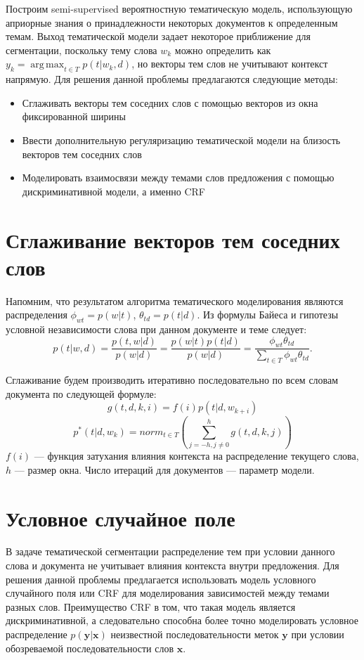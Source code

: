 \documentclass[pdftex,ptm,12pt,a4paper]{report}
\theoremstyle{definition}
\DeclareMathOperator*{\argmax}{arg\,max}
\begin{document}
 Построим semi-supervised вероятностную тематическую модель, использующую априорные знания о принадлежности некоторых документов к определенным темам. Выход тематической модели задает некоторое приближение для сегментации, поскольку тему слова $w_k$ можно определить как $y_k = \argmax_{t\in T}p(t|w_k,d)$, но векторы тем слов не учитывают контекст напрямую. Для решения данной проблемы предлагаются следующие методы: 
\begin{itemize}
	\item Сглаживать векторы тем соседних слов с помощью векторов из окна фиксированной ширины
	
	\item Ввести дополнительную регуляризацию тематической модели на близость векторов тем соседних слов
	
	\item Моделировать взаимосвязи между темами слов предложения с помощью дискриминативной модели, а именно CRF
	
\end{itemize} 

\section{Сглаживание векторов тем соседних слов}\label{smooth}

Напомним, что результатом алгоритма тематического моделирования являются распределения $\phi_{wt} = p(w|t)$, $\theta_{td} = p(t|d)$. Из формулы Байеса и гипотезы условной независимости слова при данном документе и теме следует:
\[p(t|w, d) = \frac{p(t,w|d)}{p(w|d)} = \frac{p(w|t)p(t|d)}{p(w|d)} = \frac{\phi_{wt}\theta_{td}}{\sum_{t \in T}\phi_{wt}\theta_{td}}.
\]

Сглаживание будем производить итеративно последовательно по всем словам документа по следующей формуле:
\[g(t,d ,k,i) = f(i)p(t|d, w_{k + i})\]
\[p^{*}(t|d, w_k) = norm_{t\in T}(\sum_{j=-h, j \ne 0}^{h}g(t,d,k,j))
\] 
$f(i)$ --- функция затухания влияния контекста на распределение текущего слова, $h$ --- размер окна. Число итераций для документов --- параметр модели.


\section{Условное случайное поле} \label{crf}
В задаче тематической сегментации распределение тем при условии данного слова и документа не учитывает влияния контекста внутри предложения. Для решения данной проблемы предлагается использовать модель условного случайного поля или CRF для моделирования зависимостей между темами разных слов. Преимущество CRF в том, что такая модель является дискриминативной, а следовательно способна более точно моделировать условное распределение $p(\boldsymbol{y}|\boldsymbol{x})$ неизвестной последовательности меток $\boldsymbol{y}$ при условии обозреваемой последовательности слов $\boldsymbol{x}$.  
\end{document}
